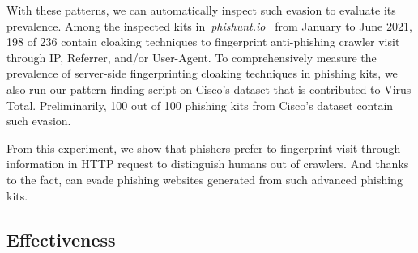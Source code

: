 With these patterns, we can automatically inspect such evasion to evaluate its prevalence.
Among the inspected kits in~\emph{phishunt.io}~\cite{phishunt} from January to June 2021, 198 of 236 contain cloaking techniques to fingerprint anti-phishing crawler visit through IP, Referrer, and/or User-Agent.
To comprehensively measure the prevalence of server-side fingerprinting cloaking techniques in phishing kits,
we also run our pattern finding script on Cisco's dataset that is contributed to Virus Total.
Preliminarily, 100 out of 100 phishing kits from Cisco's dataset contain such evasion.

From this experiment,
we show that phishers prefer to fingerprint visit through information in HTTP request to distinguish humans out of crawlers.
And thanks to the fact, \spartacus can evade phishing websites generated from such advanced phishing kits.







\subsection{Effectiveness}


